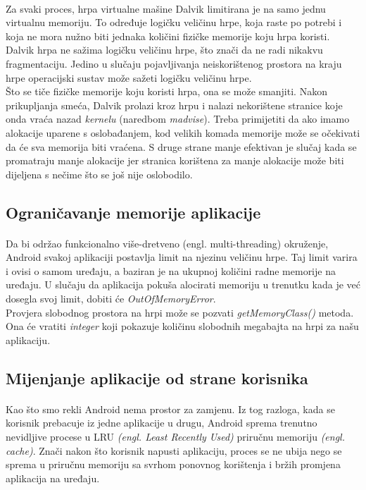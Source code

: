 \documentclass[times, utf8, zavrsni]{fer}
\begin{document}
\paragraph{}
Za svaki proces, hrpa virtualne mašine Dalvik limitirana je na samo jednu virtualnu memoriju. To određuje logičku veličinu hrpe, koja raste po potrebi i koja ne mora nužno biti jednaka količini fizičke memorije koju hrpa koristi. Dalvik hrpa ne sažima logičku veličinu hrpe, što znači da ne radi nikakvu fragmentaciju. Jedino u slučaju pojavljivanja neiskorištenog prostora na kraju hrpe operacijski sustav može sažeti logičku veličinu hrpe.\\

Što se tiče fizičke memorije koju koristi hrpa, ona se može smanjiti. Nakon prikupljanja smeća, Dalvik prolazi kroz hrpu i nalazi nekorištene stranice koje onda vraća nazad \textit{kernelu} (naredbom \textit{madvise}). Treba primijetiti da ako imamo alokacije uparene s oslobađanjem, kod velikih komada memorije može se očekivati da će sva memorija biti vraćena. S druge strane manje efektivan je slučaj kada se promatraju manje alokacije jer stranica korištena za manje alokacije može biti dijeljena s nečime što se još nije oslobodilo.

\subsection{Ograničavanje memorije aplikacije}
\paragraph{}
Da bi održao funkcionalno više-dretveno (engl. multi-threading) okruženje, Android svakoj aplikaciji postavlja limit na njezinu veličinu hrpe. Taj limit varira i ovisi o samom uređaju, a baziran je na ukupnoj količini radne memorije na uređaju. U slučaju da aplikacija pokuša alocirati memoriju u trenutku kada je već dosegla svoj limit, dobiti će \textit{OutOfMemoryError}.\\

Provjera slobodnog prostora na hrpi može se pozvati \textit{getMemoryClass()} metoda. Ona će vratiti \textit{integer} koji pokazuje količinu slobodnih megabajta na hrpi za našu aplikaciju.

\subsection{Mijenjanje aplikacije od strane korisnika}
\paragraph{}
Kao što smo rekli Android nema prostor za zamjenu. Iz tog razloga, kada se korisnik prebacuje iz jedne aplikacije u drugu, Android sprema trenutno nevidljive procese u LRU \textit{(engl. Least Recently Used)} priručnu memoriju \textit{(engl. cache)}. Znači nakon što korisnik napusti aplikaciju, proces se ne ubija nego se sprema u priručnu memoriju sa svrhom ponovnog korištenja i bržih promjena aplikacija na uređaju.\\
\end{document}
